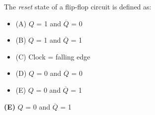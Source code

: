 

The {\it reset} state of a flip-flop circuit is defined as:

\begin{itemize}
\item{(A)} $Q$ = 1 and $\overline{Q}$ = 0
\vskip 5pt 
\item{(B)} $Q$ = 1 and $\overline{Q}$ = 1
\vskip 5pt 
\item{(C)} Clock = falling edge
\vskip 5pt 
\item{(D)} $Q$ = 0 and $\overline{Q}$ = 0
\vskip 5pt 
\item{(E)} $Q$ = 0 and $\overline{Q}$ = 1
\end{itemize}







{\bf (E)} $Q$ = 0 and $\overline{Q}$ = 1
 










